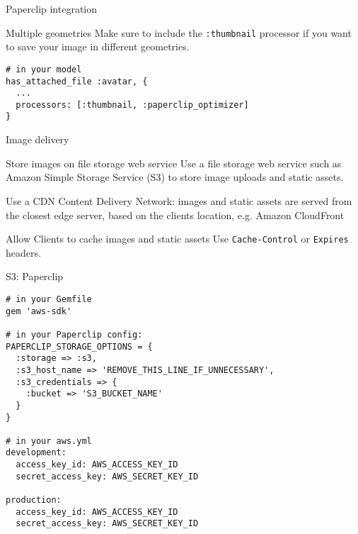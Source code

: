 \documentclass{beamer}
\begin{document}
\begin{frame}[fragile]{Paperclip integration}
\begin{block}{Multiple geometries}
Make sure to include the \lstinline{:thumbnail} processor if you want to save your image in different geometries.
\begin{lstlisting}
# in your model
has_attached_file :avatar, {
  ...
  processors: [:thumbnail, :paperclip_optimizer]
}
\end{lstlisting}
\end{block}
\end{frame}


\begin{frame}{Image delivery}
\begin{block}{Store images on file storage web service}
Use a file storage web service such as Amazon Simple Storage Service (S3) to store image uploads and static assets.
\end{block}
\begin{block}{Use a CDN}
Content Delivery Network: images and static assets are served from the closest edge server, based on the clients location, e.g. Amazon CloudFront
\end{block}
\begin{block}{Allow Clients to cache images and static assets}
Use \lstinline{Cache-Control} or \lstinline{Expires} headers.
\end{block}
\end{frame}

\begin{frame}[fragile]{S3: Paperclip}
\begin{lstlisting}
# in your Gemfile
gem 'aws-sdk'

# in your Paperclip config:
PAPERCLIP_STORAGE_OPTIONS = {
  :storage => :s3,
  :s3_host_name => 'REMOVE_THIS_LINE_IF_UNNECESSARY',
  :s3_credentials => {
    :bucket => 'S3_BUCKET_NAME'
  }
}

# in your aws.yml
development:
  access_key_id: AWS_ACCESS_KEY_ID
  secret_access_key: AWS_SECRET_KEY_ID

production:
  access_key_id: AWS_ACCESS_KEY_ID
  secret_access_key: AWS_SECRET_KEY_ID
\end{lstlisting}
\end{frame}
\end{document}
